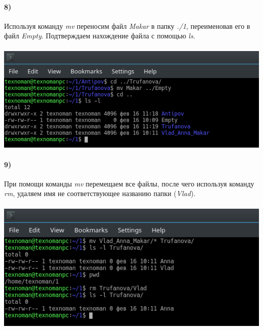	\paragraph{8)}
	Используя команду \textit{mv} переносим файл \textit{Makar} в папку \textit{./1}, переименовав его в файл \textit{Empty}.
	Подтверждаем нахождение файла с помощью \textit{ls}.\\
	\\
	\includegraphics[width=\textwidth]{8.png}

	\paragraph{9)}
	При помощи команды \textit{mv} перемещаем все файлы, после чего используя команду \textit{rm}, удаляем имя не соответствующее названию папки (\textit{Vlad}).\\
	\\
	\includegraphics[width=\textwidth]{9.png}
	\\

